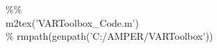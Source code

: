 \hspace{1mm}\hspace{5mm} \hspace{5mm}  \\ 
\hspace{1mm}\hspace{5mm} \hspace{5mm}  \\ 
\hspace{1mm}\hspace{5mm} \hspace{5mm} \textcolor{matlabgreen}{\%}\textcolor{matlabgreen}{\% }\\ 
\hspace{1mm}\hspace{5mm} \hspace{5mm} m2tex(\textcolor{matlabpurple}{'VARToolbox\_Code.m'}) \\ 
\hspace{1mm}\hspace{5mm} \hspace{5mm} \textcolor{matlabgreen}{\% rmpath(genpath('C:/AMPER/VARToolbox')) }\\ 
\hspace{1mm}\hspace{5mm} \hspace{5mm}  \\ 
\hspace{1mm}\hspace{5mm} \hspace{5mm}  \\ 
